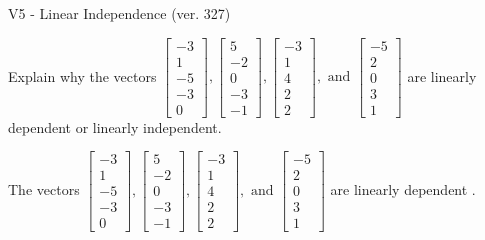 \begin{exercise}
  \begin{exerciseTitle}V5 - Linear Independence (ver. 327)\end{exerciseTitle}
  \begin{exerciseStatement}
    Explain why the vectors \(\left[\begin{array}{r}
-3 \\
1 \\
-5 \\
-3 \\
0
\end{array}\right] , \left[\begin{array}{r}
5 \\
-2 \\
0 \\
-3 \\
-1
\end{array}\right] , \left[\begin{array}{r}
-3 \\
1 \\
4 \\
2 \\
2
\end{array}\right] , \text{ and } \left[\begin{array}{r}
-5 \\
2 \\
0 \\
3 \\
1
\end{array}\right]\) are linearly dependent or linearly independent.	


  \end{exerciseStatement}
  \begin{exerciseAnswer}
   The vectors \(\left[\begin{array}{r}
-3 \\
1 \\
-5 \\
-3 \\
0
\end{array}\right] , \left[\begin{array}{r}
5 \\
-2 \\
0 \\
-3 \\
-1
\end{array}\right] , \left[\begin{array}{r}
-3 \\
1 \\
4 \\
2 \\
2
\end{array}\right] , \text{ and } \left[\begin{array}{r}
-5 \\
2 \\
0 \\
3 \\
1
\end{array}\right]\) are 
  	 linearly dependent  .
  


  \end{exerciseAnswer}
\end{exercise}